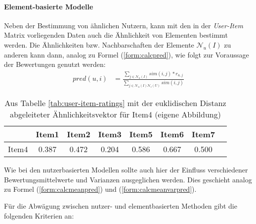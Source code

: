 \paragraph{Element-basierte Modelle} Neben der Bestimmung von ähnlichen Nutzern, kann mit den in der \textit{User-Item} Matrix vorliegenden Daten auch die Ähnlichkeit von Elementen bestimmt werden. Die Ähnlichkeiten bzw. Nachbarschaften der Elemente $\mathcal{N}_u(I)$ zu anderen kann dann, analog zu Formel (\ref{form:calcpred}), wie folgt zur Voraussage der Bewertungen genutzt werden:
\begin{align}
pred(u,i) & = \frac{ \sum_{j \in \mathcal{N}_u(I)} sim(i,j)*r_{u,j}}{ \sum_{j \in \mathcal{N}_u(I)\mathcal{N}_i(U)} sim(i,j) } \label{form:calcpreditem}
\end{align}
\begin{table}[ht]
  \centering
\begin{minipage}[b]{4in}
  \begin{tabular}{ | l || c | c | c | c | c | c | c | }
    \hline
           & Item1 & Item2 & Item3 & Item5 & Item6 & Item7 \\ \hline
Item4 &    0.387 &	0.472 &	0.204 & 0.586 & 0.667 & 0.500 \\
    \hline
  \end{tabular}
  \caption{\footnotesize Aus Tabelle \ref{tab:user-item-ratings} mit der euklidischen Distanz abgeleiteter Ähnlichkeitsvektor für Item4 { \scriptsize (eigene Abbildung)}}
  \label{tab:item-item-sim}
\end{minipage}
\end{table}
Wie bei den nutzerbasierten Modellen sollte auch hier der Einfluss verschiedener Bewertungsmittelwerte und Varianzen ausgeglichen werden. Dies geschieht analog zu Formel (\ref{form:calcmeanpred}) und (\ref{form:calcmeanvarpred}).  

Für die Abwägung zwischen nutzer- und elementbasierten Methoden gibt \citep{hb_04} die folgenden Kriterien an:

